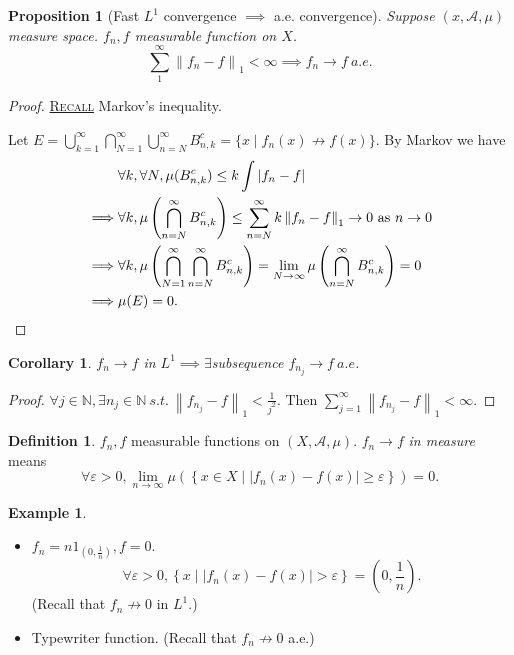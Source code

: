 \documentclass{report}
\newcommand{\N}{\mathbb{N}}
\newcommand{\st}{\ s.t.\ }
\newcommand{\cA}{\mathcal{A}}
\newcommand{\norm}[1]{\left\| #1 \right\|}
\newcommand{\fancyem}[1]{\underline{\textsc{#1}}}
\newtheorem{corollary}[theorem]{Corollary}
\newtheorem{proposition}[theorem]{Proposition}
\theoremstyle{definition}
\newtheorem{definition}[theorem]{Definition}
\newtheorem{example}[theorem]{Example}
\theoremstyle{remark}
\begin{document}
\begin{proposition}[Fast $L^1$ convergence $\implies$ a.e. convergence]
	Suppose $(x, \cA, \mu)$ measure space. $f_n, f$ measurable function on $X$.
	\[
	\sum_1^\infty \norm{f_n-f}_1 < \infty \implies f_n \to f\ a.e.	
	\]
\end{proposition}
\begin{proof}
	\fancyem{Recall} Markov's inequality.

	Let $\displaystyle E = \bigcup_{k = 1}^\infty\bigcap_{N=1}^\infty \bigcup_{n = N}^\infty B_{n, k}^c = \{x \mid f_n(x) \not\to f(x)\}$. By Markov we have
	\begin{align*}
		& \forall k, \forall N, \mu(B_{n, k}^c) \leq k \int |f_n - f| \\
		\implies & \forall k, \mu\left(\bigcap_{n=N}^\infty B_{n, k}^c\right) \leq \sum_{n = N}^\infty k \norm{f_n - f}_1 \to 0 \text{ as } n \to 0 \\
		\implies & \forall k, \mu\left(\bigcap_{N=1}^\infty\bigcap_{n=N}^\infty B_{n, k}^c\right) = \lim_{N \to \infty} \mu\left(\bigcap_{n=N}^\infty B_{n, k}^c\right) = 0 \\
		\implies & \mu(E) = 0. \qedhere
	\end{align*}
\end{proof}

\begin{corollary}
	$f_n \to f$ in $L^1 \implies \exists$subsequence $f_{n_j} \to f\ a.e$.
\end{corollary}
\begin{proof}
	$\forall j \in \N, \exists n_j \in \N \st \norm{f_{n_j} - f}_1 < \frac{1}{j^2}$. Then $\sum_{j=1}^\infty \norm{f_{n_j} - f}_1 < \infty$.
\end{proof}
\begin{definition}
	$f_n, f$ measurable functions on $(X, \cA, \mu)$. $f_n \to f$ \emph{in measure} means \[\forall \varepsilon > 0, \lim_{n \to \infty}\mu\left(\left\{x \in X \mid |f_n(x) - f(x)| \geq \varepsilon \right\}\right) = 0.\]
\end{definition}
\begin{example}
	\begin{itemize}
		\item $f_n = n1_{\left(0, \frac{1}{n}\right)}, f = 0$.
		\[
			\forall \varepsilon > 0, \left\lbrace x \mid |f_n(x) - f(x)| > \varepsilon\right\rbrace = \left(0, \frac{1}{n}\right).	
		\]
		(Recall that $f_n \not\to 0$ in $L^1$.)

		\item Typewriter function. (Recall that $f_n \not\to 0$ a.e.)
	\end{itemize}
\end{example}
\end{document}
